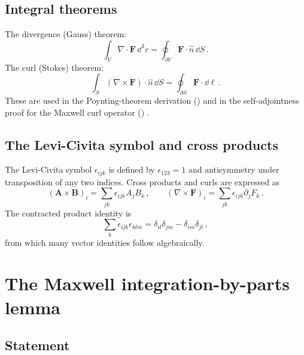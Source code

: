 \subsection{Integral theorems}
\label{sec:appA-integral}

The divergence (Gauss) theorem:
\begin{equation}\label{eq:appA-gauss}
  \int_V\nabla\cdot\mathbf{F}\,\dd^3r
  = \oint_{\partial V}\mathbf{F}\cdot\hat{n}\,\dd S\,.
\end{equation}
The curl (Stokes) theorem:
\begin{equation}\label{eq:appA-stokes}
  \int_S(\nabla\times\mathbf{F})\cdot\hat{n}\,\dd S
  = \oint_{\partial S}\mathbf{F}\cdot\dd\boldsymbol{\ell}\,.
\end{equation}
These are used in the Poynting-theorem derivation
() and in the self-adjointness proof for
the Maxwell curl operator ()
\cite{press2026photonic}.

\subsection{The Levi-Civita symbol and cross products}
\label{sec:appA-levi-civita}

The Levi-Civita symbol $\epsilon_{ijk}$ is defined by $\epsilon_{123}=1$
and antisymmetry under transposition of any two indices.  Cross products
and curls are expressed as
\begin{equation}\label{eq:appA-cross}
  (\mathbf{A}\times\mathbf{B})_i
  = \sum_{jk}\epsilon_{ijk}A_j B_k\,,
  \qquad
  (\nabla\times\mathbf{F})_i
  = \sum_{jk}\epsilon_{ijk}\partial_j F_k\,.
\end{equation}
The contracted product identity is
\begin{equation}\label{eq:appA-eps-contract}
  \sum_k\epsilon_{ijk}\epsilon_{klm}
  = \delta_{il}\delta_{jm}-\delta_{im}\delta_{jl}\,,
\end{equation}
from which many vector identities follow algebraically.

\section{The Maxwell integration-by-parts lemma}
\label{sec:appA-ibp}

\subsection{Statement}
\label{sec:appA-ibp-statement}

